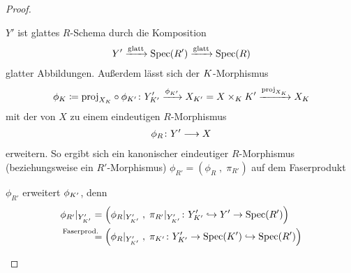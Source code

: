 \begin{Satz}
\begin{proof}
\begin{enumerate}[resume*,start=1]
\begin{description}
        $Y'$ ist glattes $R$-Schema durch die Komposition
        \begin{gather*}
          Y'\xrightarrow{\text{glatt}}\operatorname{Spec}(R')
          \xrightarrow{\text{glatt}}\operatorname{Spec}(R)
        \end{gather*}
        glatter Abbildungen.
        Außerdem lässt sich der $K$-Morphismus
        \begin{gather*}
          \phi_{K} \coloneqq \text{proj}_{X_{K}}\circ\phi_{K'}
          \colon
          Y_{K'}' \xrightarrow{\phi_{K'}} X_{K'}=X\times_{K}K'
          \xrightarrow{\text{proj}_{X_{K}}} X_{K}
        \end{gather*}
        mit der \NAbbEig von $X$ zu einem eindeutigen
        $R$-Morphismus
        \begin{gather*}
          \phi_R\colon Y'\longrightarrow X
        \end{gather*}
        erweitern.
        So ergibt sich ein kanonischer eindeutiger $R$-Morphismus
        (beziehungsweise ein $R'$-Morphismus)
        $\phi_{R'} = (\phi_R\;,\;\pi_{R'})$ auf dem Faserprodukt 
        \begin{center}
        \end{center}
        $\phi_{R'}$ erweitert $\phi_{K'}$, denn
        \begin{align*}
          \phi_{R'}|_{Y_{\K'}'}
          &= \left(
            \phi_R|_{Y_{\K'}'}\;,\;
            \pi_{R'}|_{Y_{\K'}'}\colon
            Y_{\K'}'\hookrightarrow Y'\to\Spec(R')
            \right)\\
          &\overset{\mathllap{\text{Faserprod.}}}{=} \left(
            \phi_R|_{Y_{\K'}'}\;,\;
            \pi_{\K'}\colon
            Y_{\K'}'\to \Spec(K')\hookrightarrow\Spec(R')
            \right)\\

\end{align*}
\end{description}
\end{enumerate}
\end{proof}
\end{Satz}
